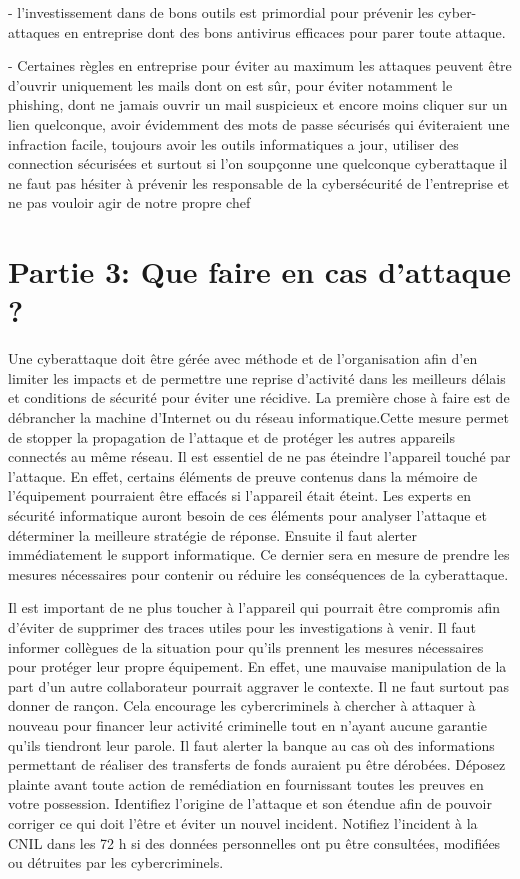 \documentclass[a4paper,11pt]{article}
\begin{document}
  - l’investissement dans de bons outils est primordial pour prévenir les cyber-attaques en entreprise dont des bons antivirus efficaces pour parer toute attaque.

  - Certaines règles en entreprise pour éviter au maximum les attaques peuvent être d’ouvrir uniquement les mails dont on est sûr, pour éviter notamment le phishing, dont ne jamais ouvrir un mail suspicieux et encore moins cliquer sur un lien quelconque, avoir évidemment des mots de passe sécurisés qui éviteraient une infraction facile, toujours avoir les outils informatiques a jour, utiliser des connection sécurisées et surtout si l’on soupçonne une quelconque cyberattaque il ne faut pas hésiter à prévenir les responsable de la cybersécurité de l’entreprise et ne pas vouloir agir de notre propre chef


\section{Partie 3: Que faire en cas d’attaque ?}

Une cyberattaque doit être gérée avec méthode et de l’organisation afin d’en limiter les impacts et de permettre une reprise d’activité dans les meilleurs délais et conditions de sécurité pour éviter une récidive.
La première chose à faire est de débrancher la machine d’Internet ou du réseau informatique.Cette mesure permet de stopper la propagation de l’attaque et de protéger les autres appareils connectés au même réseau.
Il est essentiel de ne pas éteindre l’appareil touché par l’attaque. En effet, certains éléments de preuve contenus dans la mémoire de l’équipement pourraient être effacés si l’appareil était éteint. Les experts en sécurité informatique auront besoin de ces éléments pour analyser l’attaque et déterminer la meilleure stratégie de réponse.
Ensuite il faut alerter immédiatement le support informatique. Ce dernier sera en mesure de prendre les mesures nécessaires pour contenir ou réduire les conséquences de la cyberattaque.

Il est important de ne plus toucher à l’appareil qui pourrait être compromis afin d’éviter de supprimer des traces utiles pour les investigations à venir. 
Il faut informer collègues de la situation pour qu’ils prennent les mesures nécessaires pour protéger leur propre équipement. En effet, une mauvaise manipulation de la part d’un autre collaborateur pourrait aggraver le contexte.
Il ne faut surtout pas donner de rançon. Cela encourage les cybercriminels à chercher à attaquer à nouveau pour financer leur activité criminelle tout en n’ayant aucune garantie qu’ils tiendront leur parole.
Il faut alerter la banque au cas où des informations permettant de réaliser des transferts de fonds auraient pu être dérobées.
Déposez plainte avant toute action de remédiation en fournissant toutes les preuves en votre possession.
Identifiez l’origine de l’attaque et son étendue afin de pouvoir corriger ce qui doit l’être et éviter un nouvel incident.
Notifiez l’incident à la CNIL dans les 72 h si des données personnelles ont pu être consultées, modifiées ou détruites par les cybercriminels.
\end{document}
